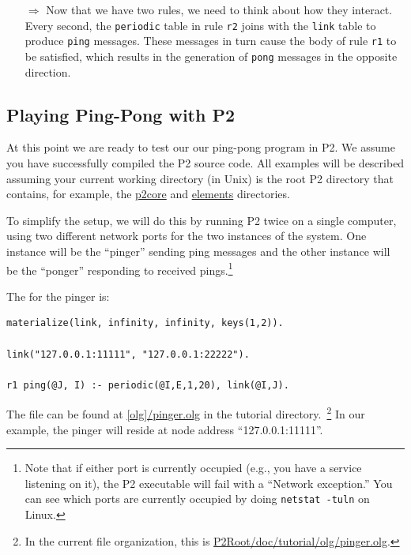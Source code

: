 \documentclass{article}
\begin{document}
\begin{itemize}
\item[$\Longrightarrow$]  Now that we have two rules, we need to think about how
  they interact.  Every second, the \lstinline$periodic$ table in rule
  \lstinline$r2$ joins with the \lstinline$link$ table to produce
  \lstinline$ping$ messages. These messages in turn cause the body of
  rule \lstinline$r1$ to be satisfied, which results in the generation
  of \lstinline$pong$ messages in the opposite direction.
\end{itemize}



\subsection{Playing Ping-Pong with P2}
At this point we are ready to test our our ping-pong program in P2.  We
assume you have successfully compiled the P2 source code. All examples
will be described assuming your current working directory (in Unix) is
the root P2 directory that contains, for example, the \url{p2core} and
\url{elements} directories. 

To simplify the setup, we will do this by running P2 twice on a single
computer, using two different network ports for the two instances of the
system.  One instance will be the ``pinger'' sending ping messages and
the other instance will be the ``ponger'' responding to received
pings.\footnote{Note that if either port is currently occupied (e.g.,
  you have a service listening on it), the P2 executable will fail with
  a ``Network exception.''  You can see which ports are currently
  occupied by doing \texttt{netstat\ -tuln} on Linux.}

The \ol for the pinger is:
\begin{lstlisting}
materialize(link, infinity, infinity, keys(1,2)).

link("127.0.0.1:11111", "127.0.0.1:22222").

r1 ping(@J, I) :- periodic(@I,E,1,20), link(@I,J).
\end{lstlisting}
The file can be found at \url{[olg]/pinger.olg} in the tutorial
directory.~\footnote{In the current file organization, this is \url{P2Root/doc/tutorial/olg/pinger.olg}.}
In our example, the pinger will reside at
node address ``127.0.0.1:11111''.
\end{document}
